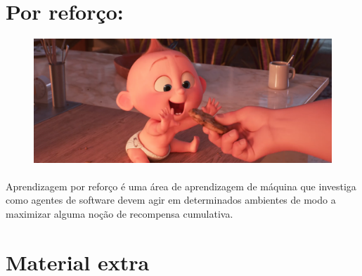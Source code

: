 \documentclass[12pt]{article}
\begin{document}
           \clearpage
           \section*{\centering Por reforço:}
           \begin{figure}[ht]
           \centering
           \includegraphics[scale=0.2]{jack-jack-num-num-cookie_orig.png}
           \end{figure}
   
           \paragraph{}Aprendizagem por reforço é uma área de aprendizagem de máquina que investiga como agentes de software devem agir em determinados ambientes de modo a maximizar alguma noção de recompensa cumulativa.
        
            \section*{\centering Material extra}
            
\end{document}
